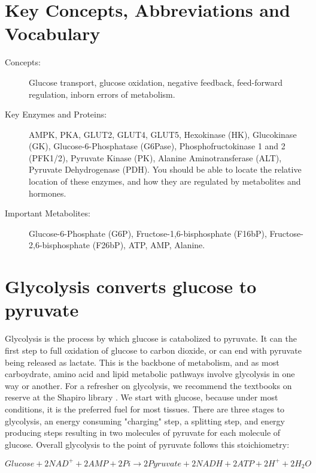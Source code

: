\documentclass{tufte-handout}
\begin{document}
\section{Key Concepts, Abbreviations and Vocabulary}

\begin{description}
	\item[Concepts:] Glucose transport, glucose oxidation, negative feedback, feed-forward regulation, inborn errors of metabolism.  
	\item[Key Enzymes and Proteins:] AMPK, PKA, GLUT2, GLUT4, GLUT5, Hexokinase (HK), Glucokinase (GK), Glucose-6-Phosphatase (G6Pase), Phosphofructokinase 1 and 2 (PFK1/2), Pyruvate Kinase (PK), Alanine Aminotransferase (ALT), Pyruvate Dehydrogenase (PDH).  You should be able to locate the relative location of these enzymes, and how they are regulated by metabolites and hormones.
	\item[Important Metabolites:] Glucose-6-Phosphate (G6P), Fructose-1,6-bisphosphate (F16bP), Fructose-2,6-bisphosphate (F26bP), ATP, AMP, Alanine.

\end{description}

\pagebreak

\section{Glycolysis converts glucose to pyruvate}

Glycolysis is the process by which glucose is catabolized to pyruvate.  It can the first step to full oxidation of glucose to carbon dioxide, or can end with pyruvate being released as lactate.  This is the backbone of metabolism, and as most carboydrate, amino acid and lipid metabolic pathways involve glycolysis in one way or another.  For a refresher on glycolysis, we recommend the textbooks on reserve at the Shapiro library \citep{Berg2013,Ferrier2017}.  We start with glucose, because under most conditions, it is the preferred fuel for most tissues.  There are three stages to glycolysis, an energy consuming "charging" step, a splitting step, and energy producing steps resulting in two molecules of pyruvate for each molecule of glucose.  Overall glycolysis to the point of pyruvate follows this stoichiometry:

\begin{equation}\label{eq:overall}
Glucose + 2NAD^+ + 2AMP + 2Pi \rightarrow 2Pyruvate + 2NADH + 2ATP + 2H^+ +2H_2O
\end{equation}
\end{document}
